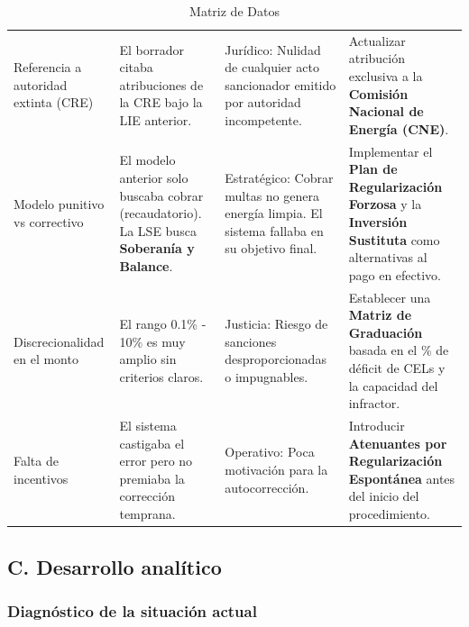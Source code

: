 \documentclass{cel}
\begin{document}
\vspace{0.3cm}
\begin{tabladoradoLargo}
\renewcommand{\tabularxcolumn}[1]{p{#1}}
\begin{xltabular}{\textwidth}{|X|X|X|X|}
\caption{Matriz de Datos} \\
\toprule
{}  &  &  &  \\
\midrule
\endhead
Referencia a autoridad extinta (CRE) & El borrador citaba atribuciones de la CRE bajo la LIE anterior. & Jurídico: Nulidad de cualquier acto sancionador emitido por autoridad incompetente. & Actualizar atribución exclusiva a la \textbf{Comisión Nacional de Energía (CNE)}. \\ \hline
Modelo punitivo vs correctivo & El modelo anterior solo buscaba cobrar (recaudatorio). La LSE busca \textbf{Soberanía y Balance}. & Estratégico: Cobrar multas no genera energía limpia. El sistema fallaba en su objetivo final. & Implementar el \textbf{\textquotedbl{}Plan de Regularización Forzosa\textquotedbl{}} y la \textbf{\textquotedbl{}Inversión Sustituta\textquotedbl{}} como alternativas al pago en efectivo. \\ \hline
Discrecionalidad en el monto & El rango 0.1\% - 10\% es muy amplio sin criterios claros. & Justicia: Riesgo de sanciones desproporcionadas o impugnables. & Establecer una \textbf{Matriz de Graduación} basada en el \% de déficit de CELs y la capacidad del infractor. \\ \hline
Falta de incentivos & El sistema castigaba el error pero no premiaba la corrección temprana. & Operativo: Poca motivación para la autocorrección. & Introducir \textbf{Atenuantes por Regularización Espontánea} antes del inicio del procedimiento. \\ \hline
\bottomrule
\end{xltabular}
\end{tabladoradoLargo}

\subsection{C. Desarrollo analítico}
\nopagebreak

\subsubsection{Diagnóstico de la situación actual}
\nopagebreak
\end{document}
